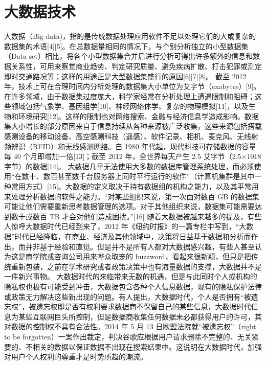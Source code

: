 \documentclass[doctor,secret]{thuthesis}
\begin{document}
\section{大数据技术}
\label{sec:orgd3d45e5}
大数据（Big data)，指的是传统数据处理应用软件不足以处理它们的大或复杂的数据集的术语[4][5]。在总数据量相同的情况下，与个别分析独立的小型数据集（Data set）相比，将各个小型数据集合并后进行分析可得出许多额外的信息和数据关系性，可用来察觉商业趋势、判定研究质量、避免疾病扩散、打击犯罪或测定即时交通路况等；这样的用途正是大型数据集盛行的原因[6][7][8]。
截至 2012 年，技术上可在合理时间内分析处理的数据集大小单位为艾字节（exabytes）[9]。在许多领域，由于数据集过度庞大，科学家经常在分析处理上遭遇限制和阻碍；这些领域包括气象学、基因组学[10]、神经网络体学、复杂的物理模拟[11]，以及生物和环境研究[12]。这样的限制也对网络搜索、金融与经济信息学造成影响。数据集大小增长的部分原因来自于信息持续从各种来源被广泛收集，这些来源包括搭载感测设备的移动设备、高空感测科技（遥感）、软件记录、相机、麦克风、无线射频辨识（RFID）和无线感测网络。自 1980 年代起，现代科技可存储数据的容量每 40 个月即增加一倍[13]；截至 2012 年，全世界每天产生 2.5 艾字节（2.5×1018 字节）的数据[14]。
大数据几乎无法使用大多数的数据库管理系统处理，而必须使用“在数十、数百甚至数千台服务器上同时平行运行的软件”（计算机集群是其中一种常用方式）[15]。大数据的定义取决于持有数据组的机构之能力，以及其平常用来处理分析数据的软件之能力。“对某些组织来说，第一次面对数百 GB 的数据集可能让他们需要重新思考数据管理的选项。对于其他组织来说，数据集可能需要达到数十或数百 TB 才会对他们造成困扰。”[16]
随着大数据被越来越多的提及，有些人惊呼大数据时代已经到来了，2012 年《纽约时报》的一篇专栏中写到，“大数据”时代已经降临，在商业、经济及其他领域中，决策将日益基于数据和分析而作出，而并非基于经验和直觉。但是并不是所有人都对大数据感兴趣，有些人甚至认为这是商学院或咨询公司用来哗众取宠的 buzzword，看起来很新颖，但只是把传统重新包装，之前在学术研究或者政策决策中也有海量数据的支撑，大数据并不是一件新兴事物。
大数据时代的来临带来无数的机遇，但是与此同时个人或机构的隐私权也极有可能受到冲击，大数据包含各种个人信息数据，现有的隐私保护法律或政策无力解决这些新出现的问题。有人提出，大数据时代，个人是否拥有“被遗忘权”，被遗忘权即是否有权利要求数据商不保留自己的某些信息，大数据时代信息为某些互联网巨头所控制，但是数据商收集任何数据未必都获得用户的许可，其对数据的控制权不具有合法性。2014 年 5 月 13 日欧盟法院就“被遗忘权”（right to be forgotten）一案作出裁定，判决谷歌应根据用户请求删除不完整的、无关紧要的、不相关的数据以保证数据不出现在搜索结果中。这说明在大数据时代，加强对用户个人权利的尊重才是时势所趋的潮流。
\end{document}
